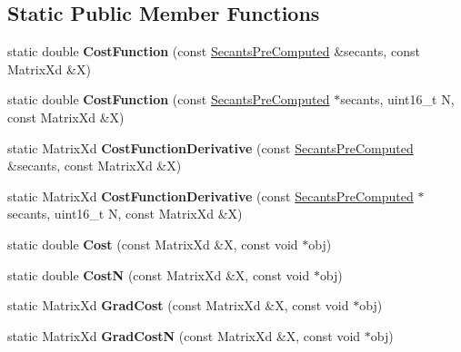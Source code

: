 \subsection*{Static Public Member Functions}
\begin{DoxyCompactItemize}
\item 
\hypertarget{struct_d_r_d_s_p_1_1_proj_secant_a5c10930e509cfd56825f40df1172c610}{static double {\bfseries Cost\-Function} (const \hyperlink{struct_d_r_d_s_p_1_1_secants_pre_computed}{Secants\-Pre\-Computed} \&secants, const Matrix\-Xd \&X)}\label{struct_d_r_d_s_p_1_1_proj_secant_a5c10930e509cfd56825f40df1172c610}

\item 
\hypertarget{struct_d_r_d_s_p_1_1_proj_secant_a5ce7cd571230df4463aca014201d5efa}{static double {\bfseries Cost\-Function} (const \hyperlink{struct_d_r_d_s_p_1_1_secants_pre_computed}{Secants\-Pre\-Computed} $\ast$secants, uint16\-\_\-t N, const Matrix\-Xd \&X)}\label{struct_d_r_d_s_p_1_1_proj_secant_a5ce7cd571230df4463aca014201d5efa}

\item 
\hypertarget{struct_d_r_d_s_p_1_1_proj_secant_a2c096207d4ccfa9a48b910e198b00b38}{static Matrix\-Xd {\bfseries Cost\-Function\-Derivative} (const \hyperlink{struct_d_r_d_s_p_1_1_secants_pre_computed}{Secants\-Pre\-Computed} \&secants, const Matrix\-Xd \&X)}\label{struct_d_r_d_s_p_1_1_proj_secant_a2c096207d4ccfa9a48b910e198b00b38}

\item 
\hypertarget{struct_d_r_d_s_p_1_1_proj_secant_a682f71bb08f836fc2cba189ad2325db6}{static Matrix\-Xd {\bfseries Cost\-Function\-Derivative} (const \hyperlink{struct_d_r_d_s_p_1_1_secants_pre_computed}{Secants\-Pre\-Computed} $\ast$secants, uint16\-\_\-t N, const Matrix\-Xd \&X)}\label{struct_d_r_d_s_p_1_1_proj_secant_a682f71bb08f836fc2cba189ad2325db6}

\item 
\hypertarget{struct_d_r_d_s_p_1_1_proj_secant_ad22a38a857df0e0f07febaa5bcdf9d78}{static double {\bfseries Cost} (const Matrix\-Xd \&X, const void $\ast$obj)}\label{struct_d_r_d_s_p_1_1_proj_secant_ad22a38a857df0e0f07febaa5bcdf9d78}

\item 
\hypertarget{struct_d_r_d_s_p_1_1_proj_secant_a5574f13bf6bd83ce2c94e18f1ee4603c}{static double {\bfseries Cost\-N} (const Matrix\-Xd \&X, const void $\ast$obj)}\label{struct_d_r_d_s_p_1_1_proj_secant_a5574f13bf6bd83ce2c94e18f1ee4603c}

\item 
\hypertarget{struct_d_r_d_s_p_1_1_proj_secant_afc42d39cde6bb6bc1d4473843b238315}{static Matrix\-Xd {\bfseries Grad\-Cost} (const Matrix\-Xd \&X, const void $\ast$obj)}\label{struct_d_r_d_s_p_1_1_proj_secant_afc42d39cde6bb6bc1d4473843b238315}

\item 
\hypertarget{struct_d_r_d_s_p_1_1_proj_secant_a8ea8b8d2cfd59a7e1a54149044a3f6a8}{static Matrix\-Xd {\bfseries Grad\-Cost\-N} (const Matrix\-Xd \&X, const void $\ast$obj)}\label{struct_d_r_d_s_p_1_1_proj_secant_a8ea8b8d2cfd59a7e1a54149044a3f6a8}

\end{DoxyCompactItemize}
